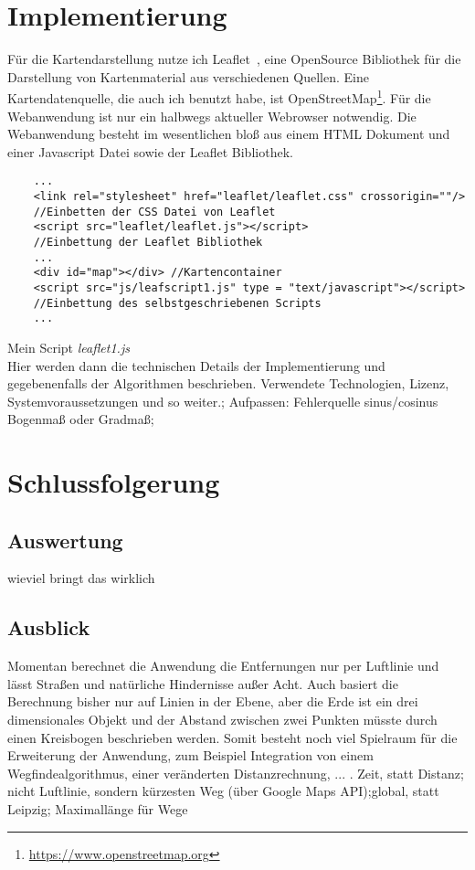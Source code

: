 \documentclass[a4paper, twoside, 12pt]{scrreprt}
\begin{document}
\chapter{Implementierung}
Für die Kartendarstellung nutze ich Leaflet~\citep{crickard2014leaflet}, eine OpenSource Bibliothek für die Darstellung von Kartenmaterial aus verschiedenen Quellen. Eine Kartendatenquelle, die auch ich benutzt habe, ist OpenStreetMap\footnote{\url{https://www.openstreetmap.org}}.
Für die Webanwendung ist nur ein halbwegs aktueller Webrowser notwendig.
Die Webanwendung besteht im wesentlichen bloß aus einem HTML Dokument und einer Javascript Datei sowie der Leaflet Bibliothek.
\begin{lstlisting}
	...
	<link rel="stylesheet" href="leaflet/leaflet.css" crossorigin=""/>
	//Einbetten der CSS Datei von Leaflet
	<script src="leaflet/leaflet.js"></script>
	//Einbettung der Leaflet Bibliothek
	...
	<div id="map"></div> //Kartencontainer
	<script src="js/leafscript1.js" type = "text/javascript"></script>
	//Einbettung des selbstgeschriebenen Scripts
	...
\end{lstlisting}
Mein Script \textit{leaflet1.js}\\
Hier werden dann die technischen Details der Implementierung und gegebenenfalls der Algorithmen beschrieben.
Verwendete Technologien, Lizenz, Systemvoraussetzungen und so weiter.;
Aufpassen: Fehlerquelle sinus/cosinus Bogenmaß oder Gradmaß;
\chapter{Schlussfolgerung}
\section{Auswertung}
wieviel bringt das wirklich
\section{Ausblick}
Momentan berechnet die Anwendung die Entfernungen nur per Luftlinie und lässt Straßen und natürliche Hindernisse außer Acht.
Auch basiert die Berechnung bisher nur auf Linien in der Ebene, aber die Erde ist ein drei dimensionales Objekt und der Abstand zwischen zwei Punkten müsste durch einen Kreisbogen beschrieben werden.
Somit besteht noch viel Spielraum für die Erweiterung der Anwendung, zum Beispiel Integration von einem Wegfindealgorithmus, einer veränderten Distanzrechnung, ... .
Zeit, statt Distanz; nicht Luftlinie, sondern kürzesten Weg (über Google Maps API);global, statt Leipzig; Maximallänge für Wege
\end{document}

